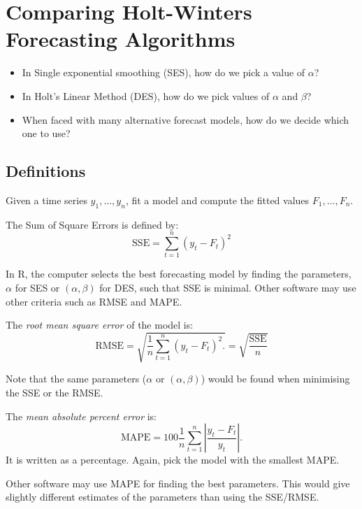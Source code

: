 \documentclass[a4paper,11pt,oneside,onecolumn]{book}
\begin{document}
\chapter{Comparing Holt-Winters Forecasting Algorithms}
\label{chp:mape:rmse}
\begin{itemize}
\item In Single exponential smoothing (SES), how do we pick a value of
$\alpha$?
\item In Holt's Linear Method (DES), how do we pick values of $\alpha$
and $\beta$?
\item When faced with many alternative forecast models, how do we
decide which one to use?
\end{itemize}

\section{Definitions}
Given a time series $y_1,\ldots,y_n$, fit a model and compute the
fitted  values $F_1,\ldots,F_n$.

\begin{definition}[SSE]
The Sum of Square Errors is defined by:
$$
\mathrm{SSE}=\sum_{t=1}^n (y_t-F_t)^2
$$
\end{definition}

In R, the computer selects the best forecasting model by finding the parameters, $\alpha$ for SES or $(\alpha,\beta)$ for DES, such that SSE is minimal.
Other software may use other criteria such as RMSE and MAPE.


\begin{definition}[RMSE]
 The {\it root mean square error} of the
model is:
\[ \mbox{RMSE} = \sqrt{\frac{1}{n} \sum_{t=1}^n (y_t - F_t)^2.}= \sqrt{\frac{\mathrm{SSE}}{n}} \] 
\end{definition}

Note that the same parameters ($\alpha$ or $(\alpha,\beta)$) would be found when minimising the SSE or the RMSE.



\begin{definition}[MAPE]
 The {\it mean absolute percent error} is:
\[ \mbox{MAPE} = 100 \frac{1}{n} \sum_{t=1}^n  \left| \frac{y_t - F_t}{y_t} \right|. \]
It is written as a percentage. Again, pick the model with the
smallest MAPE.
\end{definition}

Other software may use MAPE for finding the best parameters. This would  give slightly different estimates of the parameters than using the SSE/RMSE.
\end{document}
